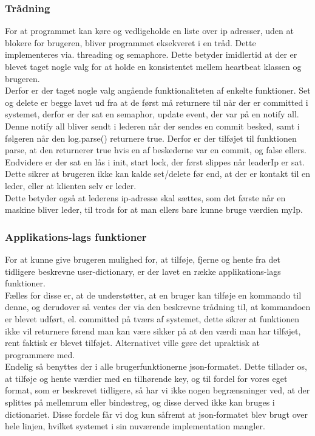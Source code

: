 \documentclass[a4paper,12pt]{article}
\begin{document}
\subsubsection{Trådning}
For at programmet kan køre og vedligeholde en liste over ip adresser, uden at blokere for brugeren, bliver programmet eksekveret i en tråd. Dette implementeres via. threading og semaphore. Dette betyder imidlertid at der er blevet taget nogle valg for at holde en konsistentet mellem heartbeat klassen og brugeren.
\\ 
Derfor er der taget nogle valg angående funktionaliteten af enkelte funktioner.
Set og delete er begge lavet ud fra at de først må returnere til når der er committed i systemet, derfor er der sat en semaphor, update event, der var på en notify all. Denne notify all bliver sendt i lederen når der sendes en commit besked, samt i følgeren når den log.parse() returnere true. Derfor er der tilføjet til funktionen parse, at den returnerer true hvis en af beskederne var en commit, og false ellers.
\\
Endvidere er der sat en lås i init, start lock, der først slippes når leaderIp er sat. Dette sikrer at brugeren ikke kan kalde set/delete før end, at der er kontakt til en leder, eller at klienten selv er leder.
\\
Dette betyder også at lederens ip-adresse skal sættes, som det første når en maskine bliver leder, til trods for at man ellers bare kunne bruge værdien myIp. 

\subsubsection{Applikations-lags funktioner}
For at kunne give brugeren mulighed for, at tilføje, fjerne og hente fra det tidligere beskrevne user-dictionary, er der lavet en række applikations-lags funktioner. \\
Fælles for disse er, at de understøtter, at en bruger kan tilføje en kommando til denne, og derudover så ventes der via den beskrevne trådning til, at kommandoen er blevet udført, el. committed på tværs af systemet, dette sikrer at funktionen ikke vil returnere førend man kan være sikker på at den værdi man har tilføjet, rent faktisk er blevet tilføjet. Alternativet ville gøre det upraktisk at programmere med.
\\[5px]
Endelig så benyttes der i alle brugerfunktionerne json-formatet. Dette tillader os, at tilføje og hente værdier med en tilhørende key, og til fordel for vores eget format, som er beskrevet tidligere, så har vi ikke nogen begrænsninger ved, at der splittes på mellemrum eller bindestreg, og disse derved ikke kan bruges i dictionariet. Disse fordele får vi dog kun såfremt at json-formatet blev brugt over hele linjen, hvilket systemet i sin nuværende implementation mangler.
\newpage
\end{document}
